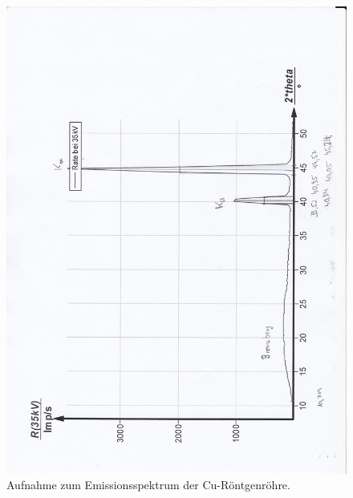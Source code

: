 \begin{figure}[p]
  \centering
  \includegraphics[width=\textwidth]{content/Peaks.jpg}
  \caption{Aufnahme zum Emissionsspektrum der Cu-Röntgenröhre.}
  \label{Bild:2}
\end{figure}
